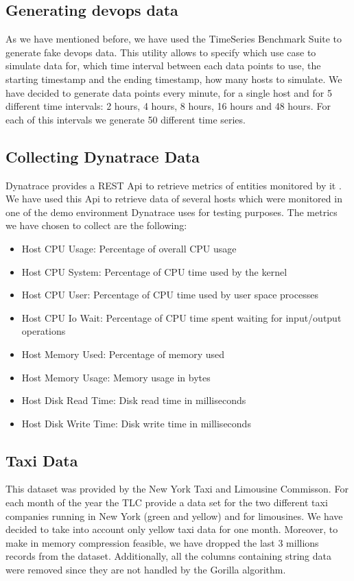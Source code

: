 \subsection{Generating devops data}
As we have mentioned before, we have used the TimeSeries Benchmark Suite to generate fake devops data.
This utility allows to specify which use case to simulate data for, which time interval between each data points
to use, the starting timestamp and the ending timestamp, how many hosts to simulate.
We have decided to generate data points every minute, for a single host and for 5 different time intervals:
2 hours, 4 hours, 8 hours, 16 hours and 48 hours. For each of this intervals we generate 50 different time series.

\subsection{Collecting Dynatrace Data}
Dynatrace provides a REST Api to retrieve metrics of entities monitored by it \cite{a2013_metrics}.
We have used this Api to retrieve data of several hosts which were monitored in one of the demo environment
Dynatrace uses for testing purposes.
The metrics we have chosen to collect are the following:
\begin{itemize}
    \item Host CPU Usage: Percentage of overall CPU usage
    \item Host CPU System: Percentage of CPU time used by the kernel
    \item Host CPU User: Percentage of CPU time used by user space processes
    \item Host CPU Io Wait: Percentage of CPU time spent waiting for input/output operations
    \item Host Memory Used: Percentage of memory used
    \item Host Memory Usage: Memory usage in bytes
    \item Host Disk Read Time: Disk read time in milliseconds
    \item Host Disk Write Time: Disk write time in milliseconds
\end{itemize}

\subsection{Taxi Data}
This dataset was provided by the New York Taxi and Limousine Commisson. For each month of the year
the TLC provide a data set for the two different taxi companies running in New York (green and yellow)
and for limousines. We have decided to take into account only yellow taxi data for one month.
Moreover, to make in memory compression feasible, we have dropped the last 3 millions records from the
dataset. Additionally, all the columns containing string data were removed since they are not handled
by the Gorilla algorithm.

